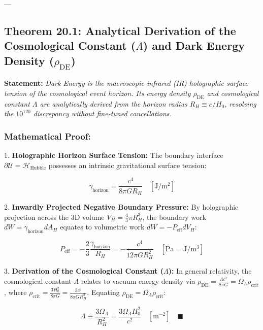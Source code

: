 \documentclass[11pt,a4paper]{article}
\theoremstyle{definition}
\theoremstyle{remark}
\begin{document}
---

\subsection{Theorem 20.1: Analytical Derivation of the Cosmological Constant ($\Lambda$) and Dark Energy Density ($\rho_{\text{DE}}$)}

\textbf{Statement:} \textit{Dark Energy is the macroscopic infrared (IR) holographic surface tension of the cosmological event horizon. Its energy density $\rho_{\text{DE}}$ and cosmological constant $\Lambda$ are analytically derived from the horizon radius $R_H \equiv c/H_0$, resolving the $10^{120}$ discrepancy without fine-tuned cancellations.}

\subsubsection{Mathematical Proof:}
1. \textbf{Holographic Horizon Surface Tension:}  
   The boundary interface $\partial \mathcal{U} = \mathcal{H}_{\text{Hubble}}$ possesses an intrinsic gravitational surface tension:
   
\begin{equation}
\gamma_{\text{horizon}} = \frac{c^4}{8\pi G R_H} \quad [\mathrm{J/m^2}]
\end{equation}


2. \textbf{Inwardly Projected Negative Boundary Pressure:}  
   By holographic projection across the 3D volume $V_H = \frac{4}{3}\pi R_H^3$, the boundary work $dW = \gamma_{\text{horizon}} dA_H$ equates to volumetric work $dW = -P_{\text{eff}} dV_H$:
   
\begin{equation}
P_{\text{eff}} = -\frac{2}{3} \frac{\gamma_{\text{horizon}}}{R_H} = -\frac{c^4}{12\pi G R_H^2} \quad [\mathrm{Pa} = \mathrm{J/m^3}]
\end{equation}


3. \textbf{Derivation of the Cosmological Constant ($\Lambda$):}  
   In general relativity, the cosmological constant $\Lambda$ relates to vacuum energy density via $\rho_{\text{DE}} = \frac{\Lambda c^2}{8\pi G} = \Omega_\Lambda \rho_{\text{crit}}$, where $\rho_{\text{crit}} = \frac{3 H_0^2}{8\pi G} = \frac{3 c^2}{8\pi G R_H^2}$.  
   Equating $\rho_{\text{DE}} = \Omega_\Lambda \rho_{\text{crit}}$:
   
\begin{equation}
\boxed{\Lambda \equiv \frac{3 \Omega_\Lambda}{R_H^2} = \frac{3 \Omega_\Lambda H_0^2}{c^2} \quad [\mathrm{m^{-2}}] \quad \blacksquare}
\end{equation}
\end{document}
